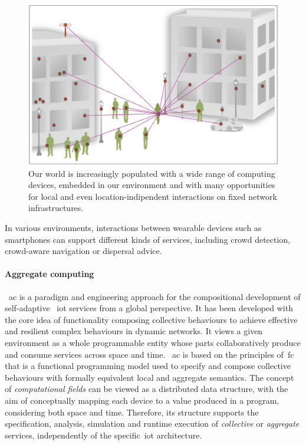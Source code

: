 \begin{figure} %
    \centering
    \includegraphics[width=.8\linewidth]{figures/smart_network_objects}
    \caption{Our world is increasingly populated with a wide range of computing devices, embedded in our environment
    and with many opportunities for local and even location-indipendent interactions on fixed network infrastructures.}
    \label{fig:smart-network-objects}
\end{figure}

In various environments, interactions between wearable devices such as smartphones can support different kinds of services,
including crowd detection, crowd-aware navigation or dispersal advice.

\paragraph{Aggregate computing}
~\ac{ac} is a paradigm and engineering approach for the compositional development of self-adaptive ~\ac{iot} services
from a global perspective.
It has been developed with the core idea of functionality composing collective behaviours to achieve effective and resilient
complex behaviours in dynamic networks.
It views a given environment as a whole programmable entity whose parts collaboratively produce and consume services
across space and time.
~\ac{ac} is based on the principles of~\ac{fc} that is a functional programming model used to specify
and compose collective behaviours with formally equivalent local and aggregate semantics.
The concept of \emph{computational fields} can be viewed as a distributed data structure,
with the aim of conceptually mapping each device to a value produced in a program, considering both
space and time.
Therefore, its structure supports the specification, analysis, simulation and runtime execution of \emph{collective}
or \emph{aggregate} services, independently of the specific~\ac{iot} architecture.

